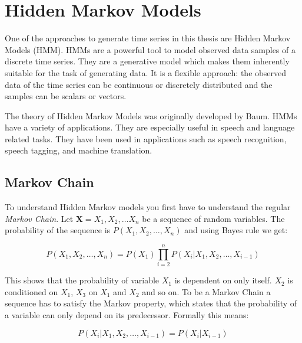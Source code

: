 
\chapter{Hidden Markov Models}\label{chapter:hmm}

One of the approaches to generate time series in this thesis are Hidden Markov Models (HMM). HMMs are a powerful tool to model observed data samples of a discrete time series. They are a generative model which makes them inherently suitable for the task of generating data. It is a flexible approach: the observed data of the time series can be continuous or discretely distributed and the samples can be scalars or vectors. 

The theory of Hidden Markov Models was originally developed by Baum. \parencite{baum1972inequality} HMMs have a variety of applications. They are especially useful in speech and language related tasks. They have been used in applications such as speech recognition, speech tagging, and machine translation.\parencite{huang2001spoken} 

\section{Markov Chain}
To understand Hidden Markov models you first have to understand the regular \emph{Markov Chain}. Let $\mathbf{X}=X_{1}, X_{2}, \ldots X_{n}$ be a sequence of random variables. The probability of the sequence is $P\left(X_{1}, X_{2}, \ldots, X_{n}\right)$ and using Bayes rule we get: 

\begin{equation}
P\left(X_{1}, X_{2}, \ldots, X_{n}\right)=P\left(X_{1}\right) \prod_{i=2}^{n} P\left(X_{i} |X_{1}, X_{2}, \ldots, X_{i-1}\right)
\end{equation}

This shows that the probability of variable $X_1$ is dependent on only itself. $X_2$ is conditioned on $X_1$, $X_3$ on $X_1$ and $X_2$ and so on. To be a Markov Chain a sequence has to satisfy the Markov property, which states that the probability of a variable can only depend on its predecessor. Formally this means: 

\begin{equation}
P\left(X_{i} | X_{1}, X_{2}, \ldots, X_{i-1}\right)=P\left(X_{i} | X_{i-1}\right)
\end{equation}

